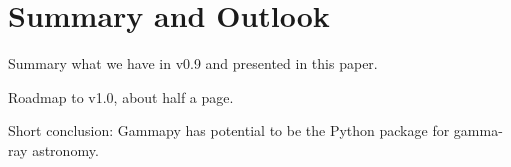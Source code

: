 \section{Summary and Outlook}
\label{sec:so}

Summary what we have in v0.9 and presented in this paper.

Roadmap to v1.0, about half a page.

Short conclusion: Gammapy has potential to be the Python package for gamma-ray astronomy.
